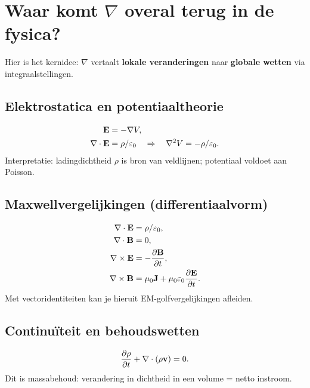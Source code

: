 \documentclass[11pt,a4paper]{article}
\begin{document}


    \section{Waar komt \texorpdfstring{$\nabla$}{∇} overal terug in de fysica?}
    Hier is het kernidee: \(\nabla\) vertaalt \textbf{lokale veranderingen} naar \textbf{globale wetten} via integraalstellingen.

    \subsection{Elektrostatica en potentiaaltheorie}
    \begin{align}
        \vb{E} &= -\nabla V,\\
        \nabla\cdot\vb{E} &= \rho/\varepsilon_0 \quad \Rightarrow \quad \nabla^2 V = -\rho/\varepsilon_0.
    \end{align}
    Interpretatie: ladingdichtheid \(\rho\) is bron van veldlijnen; potentiaal voldoet aan Poisson.

    \subsection{Maxwellvergelijkingen (differentiaalvorm)}
    \begin{align}
        \nabla\cdot\vb{E} &= \rho/\varepsilon_0,\\
        \nabla\cdot\vb{B} &= 0,\\
        \nabla\times\vb{E} &= -\pdv{\vb{B}}{t},\\
        \nabla\times\vb{B} &= \mu_0\vb{J}+\mu_0\varepsilon_0\pdv{\vb{E}}{t}.
    \end{align}
    Met vectoridentiteiten kan je hieruit EM-golfvergelijkingen afleiden.

    \subsection{Continu\"iteit en behoudswetten}
    \begin{equation}
        \pdv{\rho}{t} + \nabla\cdot(\rho \vb{v}) = 0.
    \end{equation}
    Dit is massabehoud: verandering in dichtheid in een volume = netto instroom.
\end{document}
